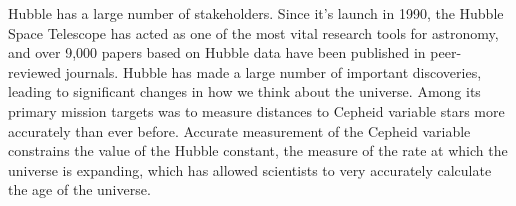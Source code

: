 \documentclass[onecolumn,10pt]{jhwhw}
\begin{document}

Hubble has a large number of stakeholders. Since it's launch in 1990, the Hubble Space Telescope has acted as one of the most vital research tools for astronomy, and over 9,000 papers based on Hubble data have been published in peer-reviewed journals. Hubble has made a large number of important discoveries, leading to significant changes in how we think about the universe. Among its primary mission targets was to measure distances to Cepheid variable stars more accurately than ever before. Accurate measurement of the Cepheid variable constrains the value of the Hubble constant, the measure of the rate at which the universe is expanding, which has allowed scientists to very accurately calculate the age of the universe.
\end{document}
